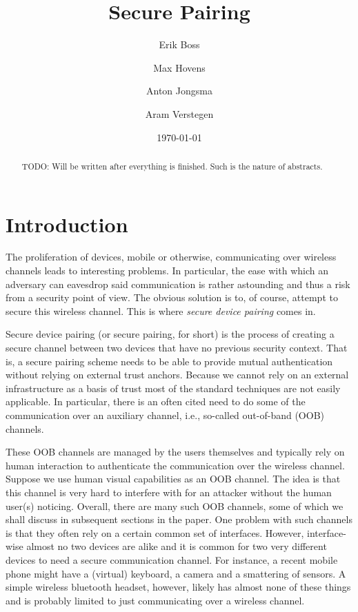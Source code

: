 \documentclass[conference, 11pt]{sty/IEEEtran}
\title{Secure Pairing}
\author{Erik Boss \and Max Hovens \and Anton Jongsma \and Aram Verstegen}
\date{\today}
\begin{document}
\maketitle

\begin{abstract}
    TODO: Will be written after everything is finished. Such is the nature of abstracts.
\end{abstract}

\section{Introduction}
\label{sec:introduction}

The proliferation of devices, mobile or otherwise, communicating over wireless channels leads to interesting problems.
In particular, the ease with which an adversary can eavesdrop said communication is rather astounding and thus a risk from a security point of view.
The obvious solution is to, of course, attempt to secure this wireless channel.
This is where \emph{secure device pairing} comes in.

Secure device pairing (or secure pairing, for short) is the process of creating a secure channel between two devices that have no previous security context.
That is, a secure pairing scheme needs to be able to provide mutual authentication without relying on external trust anchors.
Because we cannot rely on an external infrastructure as a basis of trust most of the standard techniques are not easily applicable.
In particular, there is an often cited need to do some of the communication over an auxiliary channel, i.e., so-called out-of-band (OOB) channels.

These OOB channels are managed by the users themselves and typically rely on human interaction to authenticate the communication over the wireless channel.
Suppose we use human visual capabilities as an OOB channel.
The idea is that this channel is very hard to interfere with for an attacker without the human user(s) noticing.
Overall, there are many such OOB channels, some of which we shall discuss in subsequent sections in the paper.
One problem with such channels is that they often rely on a certain common set of interfaces.
However, interface-wise almost no two devices are alike and it is common for two very different devices to need a secure communication channel.
For instance, a recent mobile phone might have a (virtual) keyboard, a camera and a smattering of sensors.
A simple wireless bluetooth headset, however, likely has almost none of these things and is probably limited to just communicating over a wireless channel.
\end{document}
